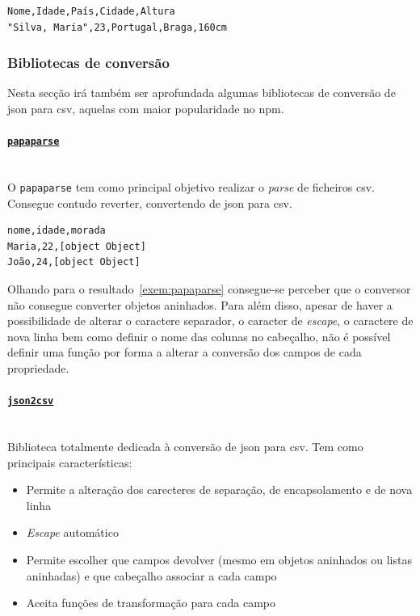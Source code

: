 \begin{lstlisting}[caption=Pequeno exemplo em \acrshort{csv}, label=exem:csvEx]
Nome,Idade,País,Cidade,Altura
"Silva, Maria",23,Portugal,Braga,160cm
\end{lstlisting}

\subsubsection{Bibliotecas de conversão}

Nesta secção irá também ser aprofundada algumas bibliotecas de conversão de \acrshort{json} para \acrshort{csv}, aquelas com maior popularidade no \acrshort{npm}.

\paragraph{\href{https://www.npmjs.com/package/papaparse}{\texttt{papaparse}}} \mbox{} \\

O \texttt{papaparse} tem como principal objetivo realizar o \textit{parse} de ficheiros \acrshort{csv}. Consegue contudo reverter, convertendo de \acrshort{json} para \acrshort{csv}.

\begin{lstlisting}[caption=Resultado da conversão do exemplo~\ref{exem:jsonBib} usando o conversor \texttt{papaparse}, label=exem:papaparse]
nome,idade,morada
Maria,22,[object Object]
João,24,[object Object]
\end{lstlisting}

Olhando para o resultado~\ref{exem:papaparse} consegue-se perceber que o conversor não consegue converter objetos aninhados. Para além disso, apesar de haver a possibilidade de alterar o caractere separador, o caracter de \textit{escape}, o caractere de nova linha bem como definir o nome das colunas no cabeçalho, não é possível definir uma função por forma a alterar a conversão dos campos de cada propriedade.

\paragraph{\href{https://www.npmjs.com/package/json2csv}{\texttt{json2csv}}} \mbox{} \\

Biblioteca totalmente dedicada à conversão de \acrshort{json} para \acrshort{csv}. Tem como principais características:
\begin{itemize}
    \item Permite a alteração dos carecteres de separação, de encapsolamento e de nova linha
    \item \textit{Escape} automático
    \item Permite escolher que campos devolver (mesmo em objetos aninhados ou listas aninhadas) e que cabeçalho associar a cada campo
    \item Aceita funções de transformação para cada campo
\end{itemize}

